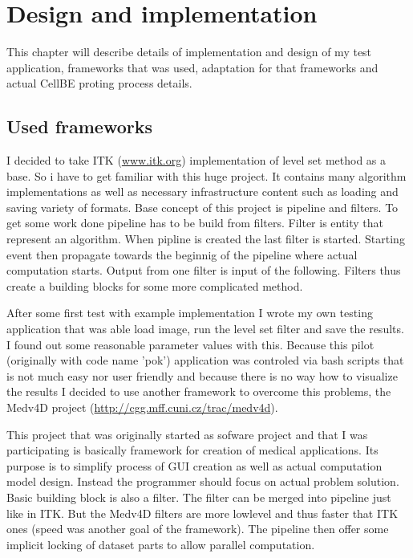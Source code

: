 \chapter{Design and implementation}

This chapter will describe details of implementation and design of my test application, frameworks that was used, adaptation for that frameworks and actual CellBE proting process details.

\section{Used frameworks}

\par
I decided to take ITK (\url{www.itk.org}) implementation of level set method as a base. So i have to get familiar with this huge project. It contains many algorithm implementations as well as necessary infrastructure content such as loading and saving variety of formats. Base concept of this project is pipeline and filters. To get some work done pipeline has to be build from filters. Filter is entity that represent an algorithm. When pipline is created the last filter is started. Starting event then propagate towards the beginnig of the pipeline where actual computation starts. Output from one filter is input of the following. Filters thus create a building blocks for some more complicated method.

\par
After some first test with example implementation I wrote my own testing application that was able load image, run the level set filter and save the results. I found out some reasonable parameter values with this. Because this pilot (originally with code name 'pok') application was controled via bash scripts that is not much easy nor user friendly and because there is no way how to visualize the results I decided to use another framework to overcome this problems, the Medv4D project (\url{http://cgg.mff.cuni.cz/trac/medv4d}).

\par
This project that was originally started as sofware project and that I was participating is basically framework for creation of medical applications. Its purpose is to simplify process of GUI creation as well as actual computation model design. Instead the programmer should focus on actual problem solution. Basic building block is also a filter. The filter can be merged into pipeline just like in ITK. But the Medv4D filters are more lowlevel and thus faster that ITK ones (speed was another goal of the framework). The pipeline then offer some implicit locking of dataset parts to allow parallel computation.

